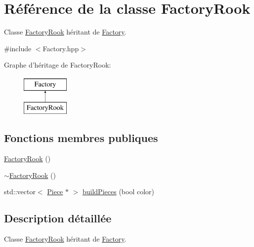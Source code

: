 \hypertarget{class_factory_rook}{\section{Référence de la classe Factory\-Rook}
\label{class_factory_rook}
}


Classe \hyperlink{class_factory_rook}{Factory\-Rook} héritant de \hyperlink{class_factory}{Factory}.  




{\ttfamily \#include $<$Factory.\-hpp$>$}

Graphe d'héritage de Factory\-Rook\-:\begin{figure}[H]
\begin{center}
\leavevmode
\includegraphics[height=2.000000cm]{class_factory_rook}
\end{center}
\end{figure}
\subsection*{Fonctions membres publiques}
\begin{DoxyCompactItemize}
\item 
\hyperlink{class_factory_rook_a4d8dfebcba093ee2f6009ffe907a8a8a}{Factory\-Rook} ()
\item 
\hyperlink{class_factory_rook_a0bc1c85e0c4db96d877ccf00566470f4}{$\sim$\-Factory\-Rook} ()
\item 
std\-::vector$<$ \hyperlink{class_piece}{Piece} $\ast$ $>$ \hyperlink{class_factory_rook_a50ff41cf552af801c123bf2b28120c68}{build\-Pieces} (bool color)
\end{DoxyCompactItemize}


\subsection{Description détaillée}
Classe \hyperlink{class_factory_rook}{Factory\-Rook} héritant de \hyperlink{class_factory}{Factory}. 


